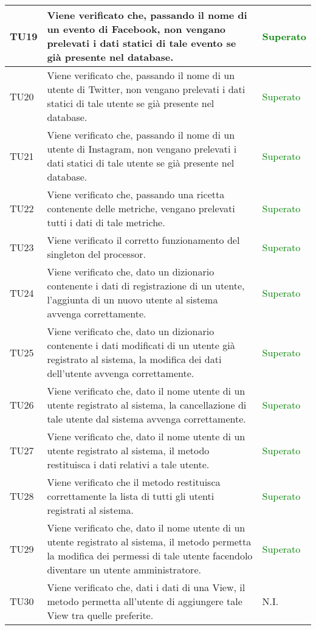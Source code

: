 \begin{center}
\begin{longtable}{| p{2cm} | p{8cm} | p{2.5cm} |}
					\hline
					TU19 & Viene verificato che, passando il nome di un evento di Facebook, non vengano prelevati i dati statici di tale evento se già presente nel database. & \textcolor{green}{Superato}\\
					\hline
					TU20 & Viene verificato che, passando il nome di un utente di Twitter, non vengano prelevati i dati statici di tale utente se già presente nel database. & \textcolor{green}{Superato}\\
					\hline
					TU21 & Viene verificato che, passando il nome di un utente di Instagram, non vengano prelevati i dati statici di tale utente se già presente nel database. & \textcolor{green}{Superato}\\
					\hline
					TU22 & Viene verificato che, passando una ricetta contenente delle metriche, vengano prelevati tutti i dati di tale metriche. & \textcolor{green}{Superato}\\
					\hline
					TU23 & Viene verificato il corretto funzionamento del singleton del processor. & \textcolor{green}{Superato}\\
					\hline
					TU24 & Viene verificato che, dato un dizionario contenente i dati di registrazione di un utente, l'aggiunta di un nuovo utente al sistema avvenga correttamente. & \textcolor{green}{Superato}\\
					\hline
					TU25 & Viene verificato che, dato un dizionario contenente i dati modificati di un utente già registrato al sistema, la modifica dei dati dell'utente avvenga correttamente. & \textcolor{green}{Superato}\\
					\hline
					TU26 & Viene verificato che, dato il nome utente di un utente registrato al sistema, la cancellazione di tale utente dal sistema avvenga correttamente. & \textcolor{green}{Superato}\\
					\hline
					TU27 & Viene verificato che, dato il nome utente di un utente registrato al sistema, il metodo restituisca i dati relativi a tale utente. & \textcolor{green}{Superato}\\
					\hline
					TU28 & Viene verificato che il metodo restituisca correttamente la lista di tutti gli utenti registrati al sistema. & \textcolor{green}{Superato}\\
					\hline
					TU29 & Viene verificato che, dato il nome utente di un utente registrato al sistema, il metodo permetta la modifica dei permessi di tale utente facendolo diventare un utente amministratore. & \textcolor{green}{Superato}\\
					\hline
					TU30 & Viene verificato che, dati i dati di una View, il metodo permetta all'utente di aggiungere tale View tra quelle preferite. & N.I.\\

\end{longtable}
\end{center}
